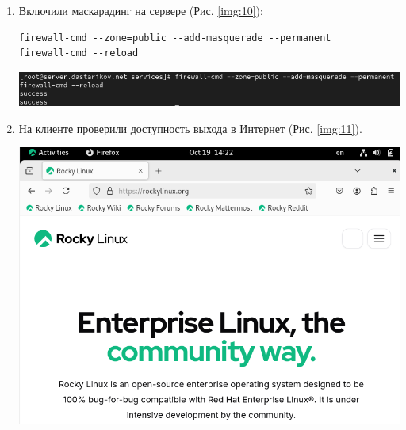\begin{enumerate}
\item Включили маскарадинг на сервере (Рис. \ref{img:10}):
    \begin{verbatim}
firewall-cmd --zone=public --add-masquerade --permanent
firewall-cmd --reload
    \end{verbatim}

\begin{center}
    \centering
    \includegraphics[width=\textwidth]{../images/image10.png}
    \label{img:10}
\end{center}

\item На клиенте проверили доступность выхода в Интернет (Рис. \ref{img:11}).

\begin{center}
    \centering
    \includegraphics[width=\textwidth]{../images/image11.png}
    \label{img:11}
\end{center}

\end{enumerate}

